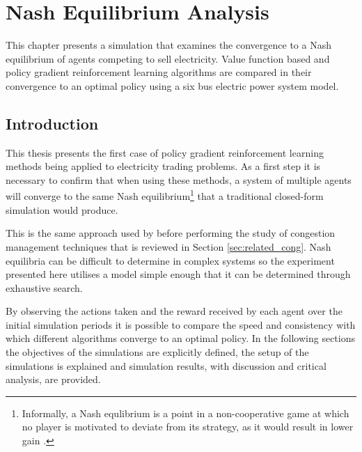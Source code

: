 \chapter{Nash Equilibrium Analysis}
\label{ch:nashanalysis}
This chapter presents a simulation that examines the convergence to a Nash
equilibrium of agents competing to sell electricity.  Value
function based and policy gradient reinforcement learning algorithms are
compared in their convergence to an optimal policy using a six bus electric
power system model.

\section{Introduction}
This thesis presents the first case of
policy gradient reinforcement learning methods being applied to electricity
trading problems.  As a first step it is necessary to confirm that when using
these methods, a system of multiple agents will converge to the same Nash
equilibrium\footnote{Informally, a Nash equlibrium is a point in a
non-cooperative game at which no player is motivated to deviate from its
strategy, as it would result in lower gain \cite{nash50,nash51}.} that
a traditional closed-form simulation would produce.

This is the same approach used by  before performing the
study of congestion management techniques that is reviewed in Section
\ref{sec:related_cong}.  Nash equilibria can be difficult
to determine in complex systems so the experiment presented here utilises a
model simple enough that it can be determined through exhaustive search.

By observing the actions taken and the reward received by each agent over the
initial simulation periods it is possible to compare the speed and consistency
with which different algorithms converge to an optimal policy. In the following
sections the objectives of the simulations are explicitly defined, the setup of
the simulations is explained and simulation results, with discussion and
critical analysis, are provided.

